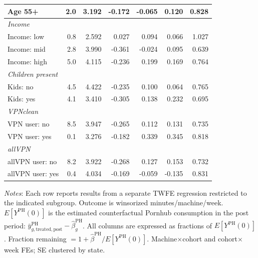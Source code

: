 \begin{landscape}
\begin{table}[htbp]
\begin{tabular}{lrr rrrr}
Age 55+ & 2.0 & 3.192 & -0.172 & -0.065 & 0.120 & 0.828 \\
\midrule
\multicolumn{7}{l}{\textit{Income}} \\
Income: low & 0.8 & 2.592 & 0.027 & 0.094 & 0.066 & 1.027 \\
Income: mid & 2.8 & 3.990 & -0.361 & -0.024 & 0.095 & 0.639 \\
Income: high & 5.0 & 4.115 & -0.236 & 0.199 & 0.169 & 0.764 \\
\midrule
\multicolumn{7}{l}{\textit{Children present}} \\
Kids: no & 4.5 & 4.422 & -0.235 & 0.100 & 0.064 & 0.765 \\
Kids: yes & 4.1 & 3.410 & -0.305 & 0.138 & 0.232 & 0.695 \\
\midrule
\multicolumn{7}{l}{\textit{VPNclean}} \\
VPN user: no & 8.5 & 3.947 & -0.265 & 0.112 & 0.131 & 0.735 \\
VPN user: yes & 0.1 & 3.276 & -0.182 & 0.339 & 0.345 & 0.818 \\
\midrule
\multicolumn{7}{l}{\textit{allVPN}} \\
allVPN user: no & 8.2 & 3.922 & -0.268 & 0.127 & 0.153 & 0.732 \\
allVPN user: yes & 0.4 & 4.034 & -0.169 & -0.059 & -0.135 & 0.831 \\
\bottomrule
\end{tabular}
\vspace{4pt}
\begin{minipage}{\linewidth}\footnotesize
\textit{Notes}: Each row reports results from a separate TWFE regression restricted to the indicated subgroup. Outcome is winsorized minutes/machine/week. $E[Y^{\text{PH}}(0)]$ is the estimated counterfactual Pornhub consumption in the post period: $\bar{y}^{\text{PH}}_{g,\text{treated},\text{post}} - \hat{\beta}^{\text{PH}}_g$. All columns are expressed as fractions of $E[Y^{\text{PH}}(0)]$. Fraction remaining $= 1 + \hat{\beta}^{\text{PH}}/E[Y^{\text{PH}}(0)]$. Machine$\times$cohort and cohort$\times$week FEs; SE clustered by state.
\end{minipage}
\end{table}
\end{landscape}

